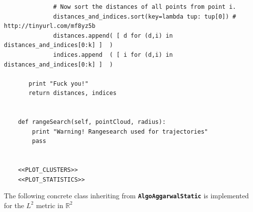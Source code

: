 \documentclass[11pt]{article}
\begin{document}
\begin{verbatim}
              # Now sort the distances of all points from point i. 
              distances_and_indices.sort(key=lambda tup: tup[0]) # http://tinyurl.com/mf8yz5b
              distances.append( [ d for (d,i) in distances_and_indices[0:k] ]  )
              indices.append  ( [ i for (d,i) in distances_and_indices[0:k] ]  )

       print "Fuck you!"
       return distances, indices


    def rangeSearch(self, pointCloud, radius):
        print "Warning! Rangesearch used for trajectories"
        pass


    <<PLOT_CLUSTERS>>
    <<PLOT_STATISTICS>>
\end{verbatim}







The following concrete class inheriting from \textbf{\verb~AlgoAggarwalStatic~} is implemented for the $L^2$ metric
in $\mathbb{R}^2$
\end{document}
